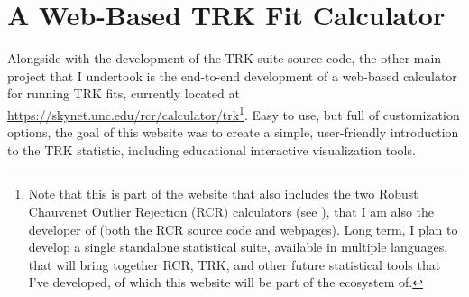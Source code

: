 \section{A Web-Based TRK Fit Calculator}
\label{sec:website}
Alongside with the development of the TRK suite source code, the other main project that I undertook is the end-to-end development of a web-based calculator for running TRK fits, currently located at \url{https://skynet.unc.edu/rcr/calculator/trk}\footnote{Note that this is part of the website that also includes the two Robust Chauvenet Outlier Rejection (RCR) calculators (see \textcite{maples2018robust}), that I am also the developer of (both the RCR source code and webpages). Long term, I plan to develop a single standalone statistical suite, available in multiple languages, that will bring together RCR, TRK, and other future statistical tools that I've developed, of which this website will be part of the ecosystem of.}. Easy to use, but full of customization options, the goal of this website was to create a simple, user-friendly introduction to the TRK statistic, including educational interactive visualization tools.

